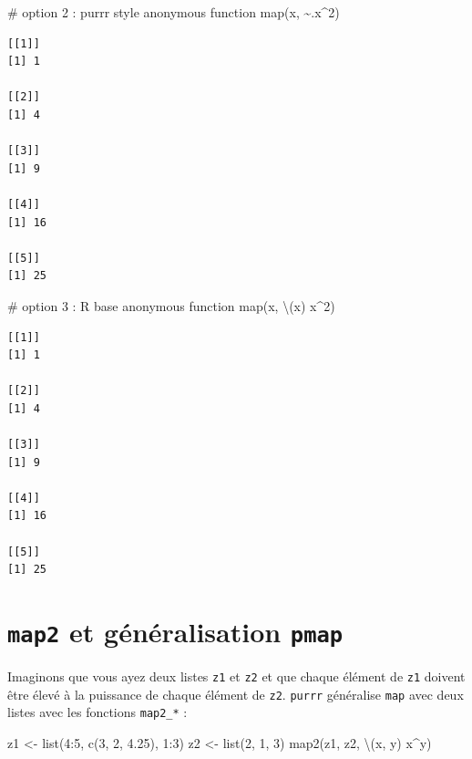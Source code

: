 \documentclass[
  letterpaper,
  DIV=11,
  numbers=noendperiod]{scrreprt}
\newenvironment{Shaded}{\begin{snugshade}}{\end{snugshade}}
\newcommand{\CommentTok}[1]{\textcolor[rgb]{0.37,0.37,0.37}{#1}}
\newcommand{\DecValTok}[1]{\textcolor[rgb]{0.68,0.00,0.00}{#1}}
\newcommand{\FloatTok}[1]{\textcolor[rgb]{0.68,0.00,0.00}{#1}}
\newcommand{\FunctionTok}[1]{\textcolor[rgb]{0.28,0.35,0.67}{#1}}
\newcommand{\NormalTok}[1]{\textcolor[rgb]{0.00,0.23,0.31}{#1}}
\newcommand{\OtherTok}[1]{\textcolor[rgb]{0.00,0.23,0.31}{#1}}
\newcommand{\SpecialCharTok}[1]{\textcolor[rgb]{0.37,0.37,0.37}{#1}}
\begin{document}
\begin{Shaded}
\begin{Highlighting}[]
\CommentTok{\# option 2 : purrr style anonymous function}
\FunctionTok{map}\NormalTok{(x, }\SpecialCharTok{\textasciitilde{}}\NormalTok{.x}\SpecialCharTok{\^{}}\DecValTok{2}\NormalTok{)    }
\end{Highlighting}
\end{Shaded}

\begin{verbatim}
[[1]]
[1] 1

[[2]]
[1] 4

[[3]]
[1] 9

[[4]]
[1] 16

[[5]]
[1] 25
\end{verbatim}

\begin{Shaded}
\begin{Highlighting}[]
\CommentTok{\# option 3 : R base anonymous function}
\FunctionTok{map}\NormalTok{(x, \textbackslash{}(x) x}\SpecialCharTok{\^{}}\DecValTok{2}\NormalTok{)  }
\end{Highlighting}
\end{Shaded}

\begin{verbatim}
[[1]]
[1] 1

[[2]]
[1] 4

[[3]]
[1] 9

[[4]]
[1] 16

[[5]]
[1] 25
\end{verbatim}

\hypertarget{map2-et-guxe9nuxe9ralisation-pmap}{%
\section{\texorpdfstring{\texttt{map2} et généralisation
\texttt{pmap}}{map2 et généralisation pmap}}\label{map2-et-guxe9nuxe9ralisation-pmap}}

Imaginons que vous ayez deux listes \texttt{z1} et \texttt{z2} et que
chaque élément de \texttt{z1} doivent être élevé à la puissance de
chaque élément de \texttt{z2}. \texttt{purrr} généralise \texttt{map}
avec deux listes avec les fonctions \texttt{map2\_*} :

\begin{Shaded}
\begin{Highlighting}[]
\NormalTok{z1 }\OtherTok{\textless{}{-}} \FunctionTok{list}\NormalTok{(}\DecValTok{4}\SpecialCharTok{:}\DecValTok{5}\NormalTok{, }\FunctionTok{c}\NormalTok{(}\DecValTok{3}\NormalTok{, }\DecValTok{2}\NormalTok{, }\FloatTok{4.25}\NormalTok{), }\DecValTok{1}\SpecialCharTok{:}\DecValTok{3}\NormalTok{)}
\NormalTok{z2 }\OtherTok{\textless{}{-}} \FunctionTok{list}\NormalTok{(}\DecValTok{2}\NormalTok{, }\DecValTok{1}\NormalTok{, }\DecValTok{3}\NormalTok{)}
\FunctionTok{map2}\NormalTok{(z1, z2, \textbackslash{}(x, y) x}\SpecialCharTok{\^{}}\NormalTok{y)}
\end{Highlighting}
\end{Shaded}
\end{document}
